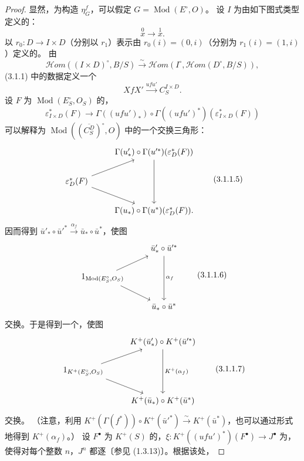 \begin{proof}
显然，为构造 $\eta_G^f$，可以假定 $G=\operatorname{Mod}(E^\circ,O)$。
设 $I$ 为由如下图式类型定义的：
\[
\overset{0}{x}\longrightarrow\overset{1}{x}. \tag{3.1.1.1}
\]
以 $r_0:D\to I\times D$（分别以 $r_1$）表示由 $r_0(i)=(0,i)$（分别为 $r_1(i)=(1,i)$）定义的。
由
\[
\mathcal{H}om((I\times D)^\circ,B/S)\xrightarrow{\sim}
\mathcal{H}om(I^\circ,\mathcal{H}om(D^\circ,B/S)), \tag{3.1.1.2}
\]
(3.1.1) 中的数据定义一个
\[
XfX'\xrightarrow{ufu'}C_S^{I\times D}. \tag{3.1.1.3}
\]
设 $F$ 为 $\operatorname{Mod}(E_S^\circ,O_S)$ 的，
\[
\varepsilon_{I\times D}^*(F)\longrightarrow
\Gamma((ufu')_*)\circ\Gamma((ufu')^*)(\varepsilon_{I\times D}^*(F)) \tag{3.1.1.4}
\]
可以解释为 $\operatorname{Mod}((\overline{C_S^D})^\circ,O)$ 中的一个交换三角形：
\[
\begin{tikzcd}
&\Gamma(u'_*)\circ\Gamma(u'^*)(\varepsilon_D^*(F))\arrow[dd]\\
\varepsilon_D^*(F)\arrow[ur]\arrow[dr]&\\
&\Gamma(u_*)\circ\Gamma(u^*)(\varepsilon_D^*(F)).
\end{tikzcd}\tag{3.1.1.5}
\]
因而得到
$\bar u'_*\circ\bar u'^*\xrightarrow{\alpha_f}\bar u_*\circ\bar u^*$，使图
\[
\begin{tikzcd}
&\bar u'_*\circ\bar u'^*\arrow[dd,"\alpha_f"]\\
1_{\operatorname{Mod}(E_S^\circ,O_S)}\arrow[ur]\arrow[dr]&\\
&\bar u_*\circ\bar u^*
\end{tikzcd}\tag{3.1.1.6}
\]
交换。于是得到一个，使图
\[
\begin{tikzcd}
&K^+(\bar u'_*)\circ K^+(\bar u'^*)\arrow[dd,"K^+(\alpha_f)"]\\
1_{K^+(E_S^\circ,O_S)}\arrow[ur]\arrow[dr]&\\
&K^+(\bar u_*)\circ K^+(\bar u^*)
\end{tikzcd}\tag{3.1.1.7}
\]
交换。
（注意，利用 $K^+(\Gamma(f^*))\circ K^+(\bar u'^*)\xrightarrow{\sim}K^+(\bar u^*)$，也可以通过形式地得到 $K^+(\alpha_f)$。）
设 $F^\bullet$ 为 $K^+(S)$ 的，$\xi:K^+((ufu')^*)(F^\bullet)\to J^\bullet$ 为，使得对每个整数 $n$，$J^n$ 都逐〔参见 (1.3.13)〕。根据该处，

\end{proof}
